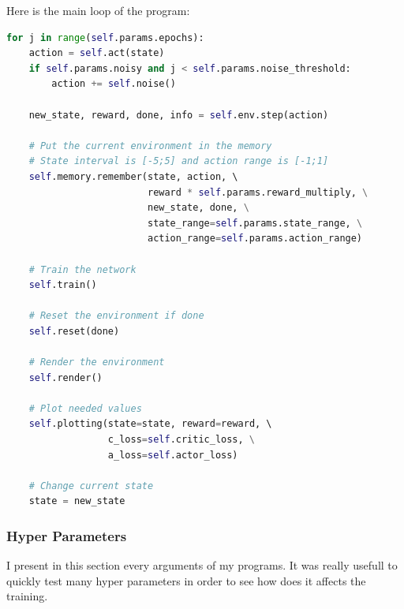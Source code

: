 \documentclass{article}
\begin{document}
Here is the main loop of the program:

\begin{lstlisting}[language=Python]
for j in range(self.params.epochs):
    action = self.act(state)
    if self.params.noisy and j < self.params.noise_threshold:
        action += self.noise()

    new_state, reward, done, info = self.env.step(action)

    # Put the current environment in the memory
    # State interval is [-5;5] and action range is [-1;1]
    self.memory.remember(state, action, \ 
                         reward * self.params.reward_multiply, \
                         new_state, done, \
                         state_range=self.params.state_range, \
                         action_range=self.params.action_range)

    # Train the network
    self.train()

    # Reset the environment if done
    self.reset(done)

    # Render the environment
    self.render()

    # Plot needed values
    self.plotting(state=state, reward=reward, \ 
                  c_loss=self.critic_loss, \
                  a_loss=self.actor_loss)

    # Change current state
    state = new_state
\end{lstlisting}

\subsubsection{Hyper Parameters}
\label{subsubsec:hp_params}

I present in this section every arguments of my programs. It was really usefull
to quickly test many hyper parameters in order to see how does it affects the
training.
\end{document}
